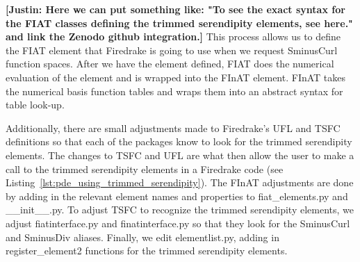 \documentclass[manuscript,screen]{acmart}
\newcommand\josh[1]{\textbf{\textcolor[rgb]{0,.5,1}{[Josh: #1]}}}
\newcommand\justin[1]{\textbf{\textcolor[rgb]{0,1,0.5}{[Justin: #1]}}}
\begin{document}
 \justin{Here we can put something like:  "To see the exact syntax for the FIAT classes defining the trimmed serendipity elements, see here."  and link the Zenodo github integration.}  This process allows us to define the FIAT element that Firedrake is going to use when we request {\selectfont SminusCurl} function spaces.  After we have the element defined, FIAT does the numerical evaluation of the element and is wrapped into the FInAT element.  FInAT takes the numerical basis function tables and wraps them into an abstract syntax for table look-up.   
 
%    

Additionally, there are small adjustments made to Firedrake's UFL and TSFC definitions so that each of the packages know to look for the trimmed serendipity elements.  The changes to TSFC and UFL are what then allow the user to make a call to the trimmed serendipity elements in a Firedrake code (see Listing~\ref{lst:pde_using_trimmed_serendipity}).  The FInAT adjustments are done by adding in the relevant element names and properties to {\selectfont fiat\_elements.py} and {\selectfont \_\_init\_\_.py}. To adjust TSFC to recognize the trimmed serendipity elements, we adjust {\selectfont fiatinterface.py} and {\selectfont finatinterface.py} so that they look for the {\selectfont SminusCurl} and {\selectfont SminusDiv} aliases.  Finally, we edit {\selectfont elementlist.py}, adding in {\selectfont register\_element2} functions for the trimmed serendipity elements. %
\end{document}
